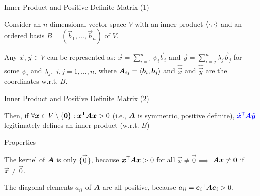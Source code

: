 \documentclass[fleqn,aspectratio=169]{beamer}
\begin{document}
\begin{frame}{Inner Product and Positive Definite Matrix (1)}

\plitemsep 0.2in

\bci 
\item Consider an $n$-dimensional vector space $V$ with an inner product $\left\langle \cdot, \cdot \right\rangle$ and an ordered basis $B=(\vec{b}_1, \ldots, \vec{b}_n)$ of $V.$

\item Any $\vec{x},\vec{y} \in V$ can be represented as: $\vec{x}=\sum_{i=1}^n \psi_i \vec{b}_i$ and $\vec{y}=\sum_{i=j}^n \lambda_j \vec{b}_j$ for some $\psi_i$ and $\lambda_j,$ $i,j=1, \ldots, n.$
where $\bm{A}_{ij} = \left\langle \bm{b}_i, \bm{b}_j \right\rangle$ and $\hat{\vec{x}}$ and $\hat{\vec{y}}$ are the coordinates w.r.t. $B.$

\eci
\end{frame}

\begin{frame}{Inner Product and Positive Definite Matrix (2)}

\plitemsep 0.2in

\bci 

\item Then, if $\forall \bm{x} \in V \setminus \{\bm{0} \}: {\bm{x}}^{\mathsf{T}} \bm{A} \bm{x} > 0$ (i.e., $\bm{A}$ is symmetric, positive definite), ${\color{blue} {\hat{\bm{x}}}^{\mathsf{T}} \bm{A} \hat{\bm{y}}}$ legitimately defines an inner product (w.r.t. $B$)

\item Properties
\bci
\item The kernel of $\bm{A}$ is only $\{\vec{0} \}$, because ${\bm{x}}^{\mathsf{T}} \bm{A} \bm{x} > 0$ for all $\vec{x} \neq \vec{0}  \implies$ $\bm{A} \bm{x} \neq \bm{0}$ if $\vec{x} \neq \vec{0}.$
\item The diagonal elements $a_{ii}$ of $\bm{A}$ are all positive, because $a_{ii} = {\bm{e}_i}^{\mathsf{T}} \bm{A} \bm{e}_i >0.$
\eci
\eci
\end{frame}


\end{document}
